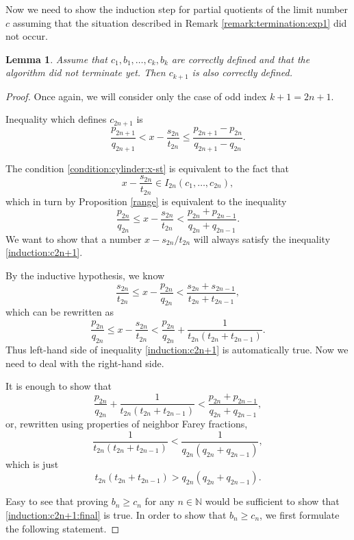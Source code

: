 \documentclass{amsart}
\newtheorem{lemma}[theorem]{Lemma}
\theoremstyle{definition}
\newcommand{\N}{\mathbb N}%
\newcommand{\0}{\mbf 0}%
\def\N{\mathbb N}
\begin{document}
Now we need to show the induction step for partial quotients of the limit number $c$ assuming that the situation described in Remark \ref{remark:termination:exp1} did not occur.

\begin{lemma}\label{ck+1_correctly_defined}
    Assume that $c_1,b_1,\ldots,c_k,b_k$ are correctly defined and that the algorithm did not terminate yet. Then $c_{k+1}$ is also correctly defined.
\end{lemma}
\begin{proof}
Once again, we will consider only the case of odd index $k+1=2n+1$.

Inequality which defines $c_{2n+1}$ is 
$$
\frac{p_{2n+1}}{q_{2n+1}} < x - \frac{s_{2n}}{t_{2n}} \leq \frac{p_{2n+1}-p_{2n}}{q_{2n+1}-q_{2n}}.
$$

The condition \eqref{condition:cylinder:x-st} is equivalent to the fact that 
$$
x-\frac{s_{2n}}{t_{2n}} \in I_{2n}(c_1,\ldots,c_{2n}),
$$
which in turn by Proposition \ref{range} is equivalent to the inequality
\begin{equation}\label{induction:c2n+1}
\frac{p_{2n}}{q_{2n}} \leq x - \frac{s_{2n}}{t_{2n}} <   \frac{p_{2n}+p_{2n-1}}{q_{2n}+q_{2n-1}}.
\end{equation}
We want to show that a number $x-s_{2n}/t_{2n}$ will always satisfy the inequality \eqref{induction:c2n+1}.

By the inductive hypothesis, we know 
$$
\frac{s_{2n}}{t_{2n}} \leq x - \frac{p_{2n}}{q_{2n}} < \frac{s_{2n}+s_{2n-1}}{t_{2n}+t_{2n-1}},
$$
which can be rewritten as 
$$
\frac{p_{2n}}{q_{2n}} \leq x - \frac{s_{2n}}{t_{2n}} <\frac{p_{2n}}{q_{2n}} + \frac{1}{t_{2n}(t_{2n}+t_{2n-1})}.
$$
Thus left-hand side of inequality \eqref{induction:c2n+1} is automatically true. Now we need to deal with the right-hand side.

It is enough to show that
$$
\frac{p_{2n}}{q_{2n}} + \frac{1}{t_{2n}(t_{2n}+t_{2n-1})} < \frac{p_{2n}+p_{2n-1}}{q_{2n}+q_{2n-1}},
$$
or, rewritten using properties of neighbor Farey fractions,
\begin{equation}
\frac{1}{t_{2n}(t_{2n}+t_{2n-1})} < \frac{1}{q_{2n}(q_{2n}+q_{2n-1})},
\end{equation}
which is just
\begin{equation}\label{induction:c2n+1:final}
t_{2n}(t_{2n}+t_{2n-1}) >q_{2n}(q_{2n}+q_{2n-1}).
\end{equation}

Easy to see that proving $b_n\geq c_n$ for any $n\in\N$ would be sufficient to show that \eqref{induction:c2n+1:final} is true. In order to show that $b_n\geq c_n$, we first formulate the following statement.


\end{proof}
\end{document}
